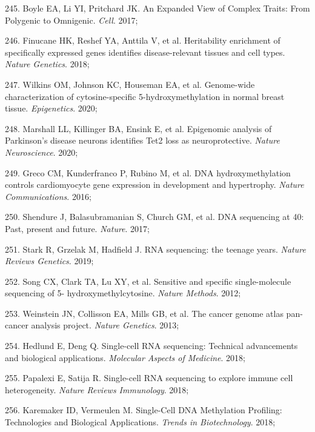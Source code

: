 \documentclass[11pt,oneside]{bristolthesis}
\newenvironment{cslreferences}%
  {}%
  {\par}
\begin{document}
\begin{cslreferences}
\leavevmode\hypertarget{ref-Boyle2017}{}%
245. Boyle EA, Li YI, Pritchard JK. An Expanded View of Complex Traits: From Polygenic to Omnigenic. \emph{Cell}. 2017;

\leavevmode\hypertarget{ref-Finucane2018}{}%
246. Finucane HK, Reshef YA, Anttila V, et al. Heritability enrichment of specifically expressed genes identifies disease-relevant tissues and cell types. \emph{Nature Genetics}. 2018;

\leavevmode\hypertarget{ref-Wilkins2020}{}%
247. Wilkins OM, Johnson KC, Houseman EA, et al. Genome-wide characterization of cytosine-specific 5-hydroxymethylation in normal breast tissue. \emph{Epigenetics}. 2020;

\leavevmode\hypertarget{ref-Marshall2020}{}%
248. Marshall LL, Killinger BA, Ensink E, et al. Epigenomic analysis of Parkinson's disease neurons identifies Tet2 loss as neuroprotective. \emph{Nature Neuroscience}. 2020;

\leavevmode\hypertarget{ref-Greco2016}{}%
249. Greco CM, Kunderfranco P, Rubino M, et al. DNA hydroxymethylation controls cardiomyocyte gene expression in development and hypertrophy. \emph{Nature Communications}. 2016;

\leavevmode\hypertarget{ref-Shendure2017}{}%
250. Shendure J, Balasubramanian S, Church GM, et al. DNA sequencing at 40: Past, present and future. \emph{Nature}. 2017;

\leavevmode\hypertarget{ref-Stark2019}{}%
251. Stark R, Grzelak M, Hadfield J. RNA sequencing: the teenage years. \emph{Nature Reviews Genetics}. 2019;

\leavevmode\hypertarget{ref-Song2012}{}%
252. Song CX, Clark TA, Lu XY, et al. Sensitive and specific single-molecule sequencing of 5- hydroxymethylcytosine. \emph{Nature Methods}. 2012;

\leavevmode\hypertarget{ref-Weinstein2013}{}%
253. Weinstein JN, Collisson EA, Mills GB, et al. The cancer genome atlas pan-cancer analysis project. \emph{Nature Genetics}. 2013;

\leavevmode\hypertarget{ref-Hedlund2018}{}%
254. Hedlund E, Deng Q. Single-cell RNA sequencing: Technical advancements and biological applications. \emph{Molecular Aspects of Medicine}. 2018;

\leavevmode\hypertarget{ref-Papalexi2018}{}%
255. Papalexi E, Satija R. Single-cell RNA sequencing to explore immune cell heterogeneity. \emph{Nature Reviews Immunology}. 2018;

\leavevmode\hypertarget{ref-Karemaker2018}{}%
256. Karemaker ID, Vermeulen M. Single-Cell DNA Methylation Profiling: Technologies and Biological Applications. \emph{Trends in Biotechnology}. 2018;


\end{cslreferences}
\end{document}
